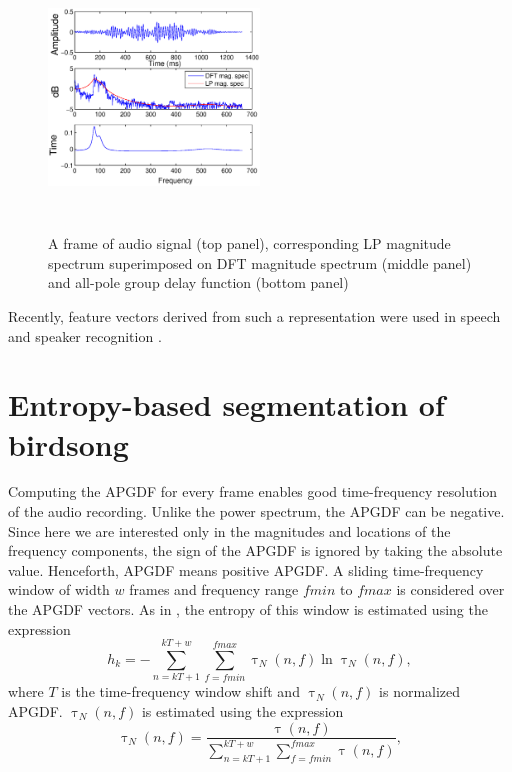 \documentclass[a4paper]{article}
\begin{document}
\begin{figure}[h]

\includegraphics[width=0.5\textwidth,height=7cm]
{apgd.eps}
\caption{A frame of audio signal (top panel), corresponding LP
magnitude spectrum superimposed on DFT magnitude spectrum (middle panel) and
all-pole group delay function (bottom panel)  }
\label{fig:all-pole}
\end{figure}


Recently, feature vectors
derived from such a representation were used in speech \cite{drugman} and speaker
recognition \cite{padman}. 









\section{Entropy-based segmentation of birdsong}

Computing the APGDF for every frame enables good time-frequency resolution of  the audio recording. Unlike the power spectrum, the APGDF can be negative. 
Since here we are interested only in the magnitudes and
locations of the frequency components, the sign of the APGDF is
ignored by taking the absolute value. Henceforth, APGDF means positive APGDF. 
 A sliding time-frequency window of width $w$ frames and frequency range
$fmin$ to $fmax$ is considered over the APGDF vectors. As in \cite{wang2013},
the entropy of this window is estimated using the expression
\begin{equation}
h_{k}=-\sum_{n=kT+1}^{kT+w}\sum_{f=fmin}^{fmax} \uptau_N(n,f) \ln \uptau_N(n,f),
\end{equation}
where $T$ is the time-frequency window shift and $\uptau_N(n,f)$ is normalized APGDF. $\uptau_N(n,f)$ is estimated using the expression 
\begin{equation}
\uptau_N(n,f)=\frac {\uptau(n,f)}
{\sum_{n=kT+1}^{kT+w}\sum_{f=fmin}^{fmax} \uptau(n,f)},
\end{equation}
\end{document}
